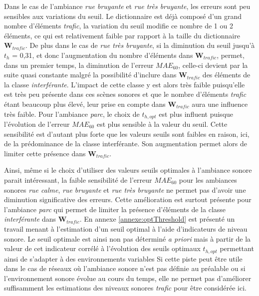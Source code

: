 Dans le cas de l'ambiance \textit{rue bruyante} et \textit{rue très bruyante}, les erreurs sont peu sensibles aux variations du seuil. Le dictionnaire est déjà composé d'un grand nombre d'éléments \textit{trafic}, la variation du seuil modifie ce nombre de 1 ou 2 éléments, ce qui est relativement faible par rapport à la taille du dictionnaire $\mathbf{W}_{trafic}$. 
De plus dans le cas de \textit{rue très bruyante}, si la diminution du seuil jusqu'à $t_h$ = 0,31, et donc l'augmentation du nombre d'éléments dans $\mathbf{W}_{trafic}$, permet, dans un premier temps, la diminution de l'erreur $MAE_{60}$, celle-ci devient par la suite quasi constante malgré la possibilité d'inclure dans $\mathbf{W}_{trafic}$ des éléments de la classe \textit{interférante}. 
L'impact de cette classe y est alors très faible puisqu'elle est très peu présente dans ces scènes sonores et que le nombre d'éléments \textit{trafic} étant beaucoup plus élevé, leur prise en compte dans $\mathbf{W}_{trafic}$ aura une influence très faible. 
Pour l'ambiance \textit{parc}, le choix de $t_{h,opt}$ est plus influent puisque l'évolution de l'erreur $MAE_{60}$ est plus sensible à la valeur du seuil. Cette sensibilité est d'autant plus forte que les valeurs seuils sont faibles en raison, ici, de la prédominance de la classe interférante. Son augmentation permet alors de limiter cette présence dans $\mathbf{W}_{trafic}$.

Ainsi, même si le choix d'utiliser des valeurs seuils optimales à l'ambiance sonore parait intéressant, la faible sensibilité de l'erreur $MAE_{60}$ pour les ambiances sonores \textit{rue calme}, \textit{rue bruyante} et \textit{rue très bruyante} ne permet pas d'avoir une diminution significative des erreurs. Cette amélioration est surtout présente pour l'ambiance \textit{parc} qui permet de limiter la présence d'éléments de la classe \textit{interférante} dans $\mathbf{W}_{trafic}$.
En annexe \ref{annexe:optThreshold} est présenté un travail menant à l'estimation d'un seuil optimal à l'aide d'indicateurs de niveau sonore. Le seuil optimale est ainsi non pas déterminé \textit{a priori} mais à partir de la valeur de cet indicateur corrélé à l'évolution des seuils optimaux $t_{h,opt}$ permettant ainsi de s'adapter à des environnements variables Si cette piste peut être utile dans le cas de réseaux où l'ambiance sonore n'est pas définie au préalable ou si l'environnement sonore évolue au cours du temps, elle ne permet pas d'améliorer suffisamment les estimations des niveaux sonores \textit{trafic} pour être considérée ici.

%